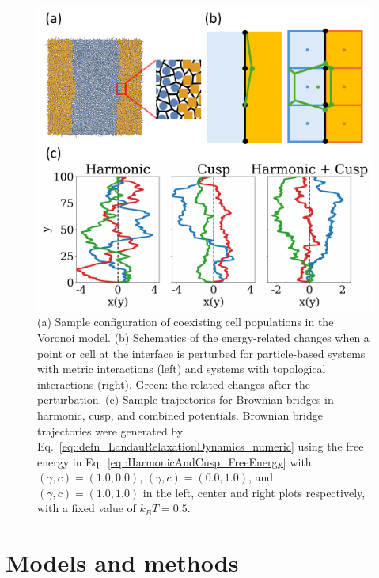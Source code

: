 \documentclass[twoside,twocolumn,9pt]{article}
\begin{document}
\begin{figure}[t]
    \centering
    \includegraphics[width=0.95\columnwidth]{Figure_methods.pdf}
    \caption{(a) Sample configuration of coexisting cell populations in the Voronoi model. (b) Schematics of the energy-related changes when a point or cell at the interface is perturbed for particle-based systems with metric interactions (left) and systems with topological interactions (right). Green: the related changes after the perturbation. (c) Sample trajectories for Brownian bridges in harmonic, cusp, and combined potentials. Brownian bridge trajectories were generated by Eq.~\ref{eq::defn_LandauRelaxationDynamics_numeric} using the free energy in Eq.~\ref{eq::HarmonicAndCusp_FreeEnergy} with $(\gamma,c)=(1.0,0.0)$, $(\gamma,c)=(0.0,1.0)$, and $(\gamma,c)=(1.0,1.0)$ in the left, center and right plots respectively, with a fixed value of $k_{B}T=0.5$.}
    \label{fig:methods}
\end{figure}

\section{Models and methods}
\end{document}
